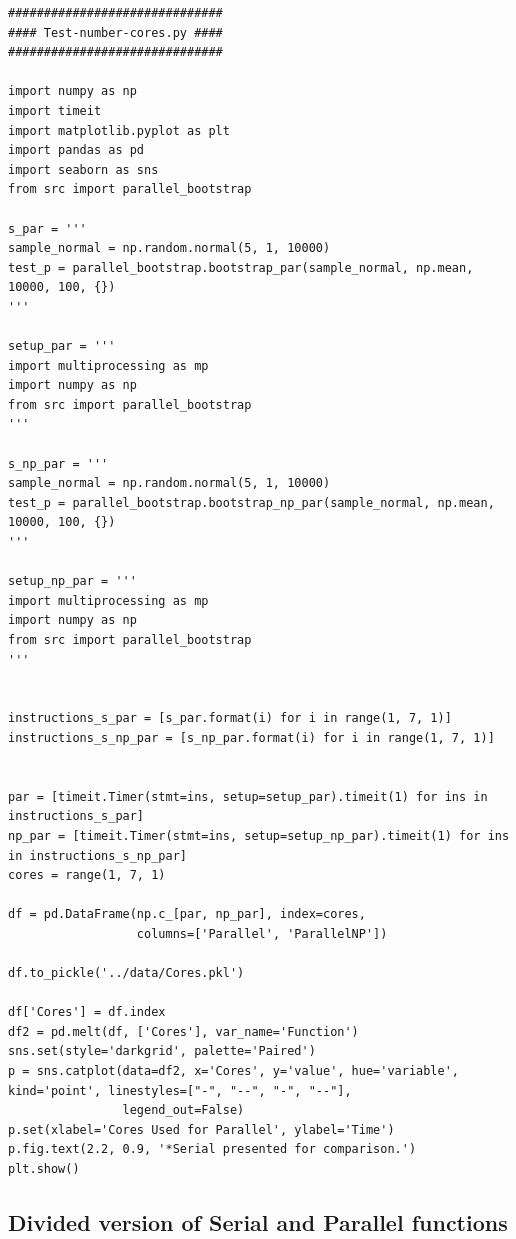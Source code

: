\documentclass[11pt]{article}
\begin{document}
\begin{Verbatim}[fontsize=\tiny]
##############################
#### Test-number-cores.py ####
##############################

import numpy as np
import timeit
import matplotlib.pyplot as plt
import pandas as pd
import seaborn as sns
from src import parallel_bootstrap

s_par = '''
sample_normal = np.random.normal(5, 1, 10000)
test_p = parallel_bootstrap.bootstrap_par(sample_normal, np.mean, 10000, 100, {})
'''

setup_par = '''
import multiprocessing as mp
import numpy as np
from src import parallel_bootstrap
'''

s_np_par = '''
sample_normal = np.random.normal(5, 1, 10000)
test_p = parallel_bootstrap.bootstrap_np_par(sample_normal, np.mean, 10000, 100, {})
'''

setup_np_par = '''
import multiprocessing as mp
import numpy as np
from src import parallel_bootstrap
'''


instructions_s_par = [s_par.format(i) for i in range(1, 7, 1)]
instructions_s_np_par = [s_np_par.format(i) for i in range(1, 7, 1)]


par = [timeit.Timer(stmt=ins, setup=setup_par).timeit(1) for ins in instructions_s_par]
np_par = [timeit.Timer(stmt=ins, setup=setup_np_par).timeit(1) for ins in instructions_s_np_par]
cores = range(1, 7, 1)

df = pd.DataFrame(np.c_[par, np_par], index=cores,
                  columns=['Parallel', 'ParallelNP'])

df.to_pickle('../data/Cores.pkl')

df['Cores'] = df.index
df2 = pd.melt(df, ['Cores'], var_name='Function')
sns.set(style='darkgrid', palette='Paired')
p = sns.catplot(data=df2, x='Cores', y='value', hue='variable', kind='point', linestyles=["-", "--", "-", "--"],
                legend_out=False)
p.set(xlabel='Cores Used for Parallel', ylabel='Time')
p.fig.text(2.2, 0.9, '*Serial presented for comparison.')
plt.show()

\end{Verbatim}

\subsection{Divided version of Serial and Parallel functions}
\end{document}
